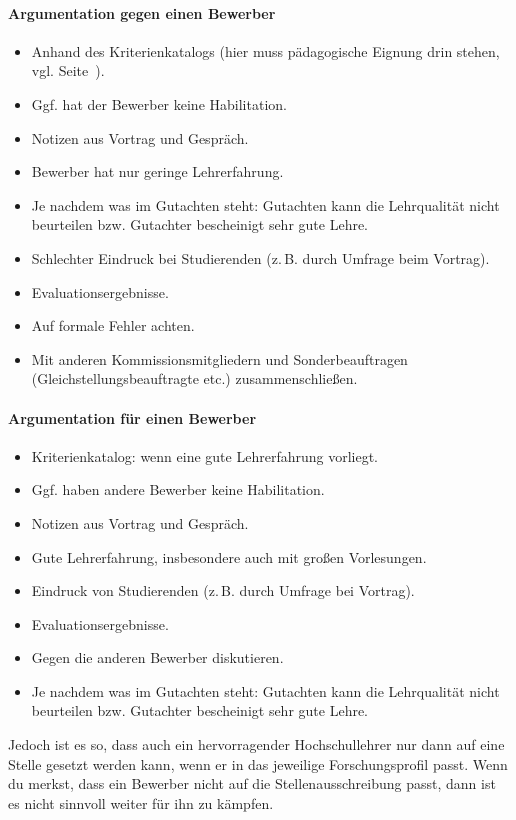 \documentclass[10pt,twoside,a5paper,openright]{book}
\begin{document}
\paragraph{Argumentation gegen einen Bewerber}
\begin{itemize}
	\item Anhand des Kriterienkatalogs (hier muss pädagogische Eignung drin stehen, vgl. Seite~\pageref{kriterienkatalog}).
	\item Ggf. hat der Bewerber keine Habilitation.
	\item Notizen aus Vortrag und Gespräch.
	\item Bewerber hat nur geringe Lehrerfahrung.
	\item Je nachdem was im Gutachten steht: Gutachten kann die Lehrqualität nicht beurteilen bzw. Gutachter bescheinigt sehr gute Lehre.
	\item Schlechter Eindruck bei Studierenden (z.\,B. durch Umfrage beim Vortrag).
	\item Evaluationsergebnisse.
	\item Auf formale Fehler achten.
	\item Mit anderen Kommissionsmitgliedern und Sonderbeauftragen (Gleichstellungsbeauftragte etc.) zusammenschließen.
\end{itemize}

\paragraph{Argumentation für einen Bewerber}
\begin{itemize}
	\item Kriterienkatalog: wenn eine gute Lehrerfahrung vorliegt.
	\item Ggf. haben andere Bewerber keine Habilitation.
	\item Notizen aus Vortrag und Gespräch.
	\item Gute Lehrerfahrung, insbesondere auch mit großen Vorlesungen.
	\item Eindruck von Studierenden (z.\,B. durch Umfrage bei Vortrag).
	\item Evaluationsergebnisse.
	\item Gegen die anderen Bewerber diskutieren.
	\item Je nachdem was im Gutachten steht: Gutachten kann die Lehrqualität nicht beurteilen bzw. Gutachter bescheinigt sehr gute Lehre.
\end{itemize}

Jedoch ist es so, dass auch ein hervorragender Hochschullehrer nur dann auf eine Stelle gesetzt werden kann, wenn er in das jeweilige Forschungsprofil passt. Wenn du merkst, dass ein Bewerber nicht auf die Stellenausschreibung passt, dann ist es nicht sinnvoll weiter für ihn zu kämpfen.
\end{document}
